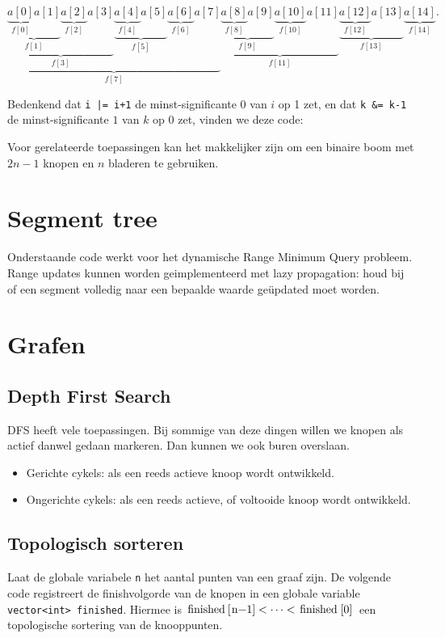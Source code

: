 \documentclass[10pt,a4paper,titlepage]{article}
\begin{document}
\iftrue
\[
\underbrace{
\underbrace{\underbrace{\underbrace{a[0]}_{f[0]} a[1]}_{f[1]} \underbrace{a[2]}_{f[2]} a[3]}_{f[3]}
\underbrace{\underbrace{a[4]}_{f[4]} a[5]}_{f[5]} \underbrace{a[6]}_{f[6]} a[7]}_{f[7]}
\underbrace{\underbrace{\underbrace{a[8]}_{f[8]} a[9]}_{f[9]} \underbrace{a[10]}_{f[10]} a[11]}_{f[11]}
\underbrace{\underbrace{a[12]}_{f[12]} a[13]}_{f[13]} \underbrace{a[14]}_{f[14]}.
\]

Bedenkend dat \lstinline{i |= i+1} de minst-significante 0 van $i$ op 1 zet, en dat \lstinline{k &= k-1} de minst-significante $1$ van $k$ op 0 zet, vinden we deze code:


Voor gerelateerde toepassingen kan het makkelijker zijn om een binaire boom met $2n-1$ knopen en $n$ bladeren te gebruiken.
\fi

\section{Segment tree}
Onderstaande code werkt voor het dynamische Range Minimum Query probleem. Range updates kunnen worden geimplementeerd met lazy propagation: houd bij of een segment volledig naar een bepaalde waarde ge\"updated moet worden.



\section{Grafen}

\subsection{Depth First Search}

DFS heeft vele toepassingen. Bij sommige van deze dingen willen we knopen als actief danwel gedaan markeren. Dan kunnen we ook buren overslaan.
\begin{itemize}[noitemsep,nolistsep]
\item Gerichte cykels: als een reeds actieve knoop wordt ontwikkeld.
\item Ongerichte cykels: als een reeds actieve, of voltooide knoop wordt ontwikkeld.
\end{itemize}

\subsection{Topologisch sorteren}

Laat de globale variabele \texttt{n} het aantal punten van een graaf zijn.
De volgende code registreert de finishvolgorde van de knopen in een globale variable \lstinline{vector<int> finished}. Hiermee is $\text{\lstinline{finished[n-1]}} < \cdots < \text{\lstinline{finished[0]}}$ een topologische sortering van de knooppunten.
\end{document}
